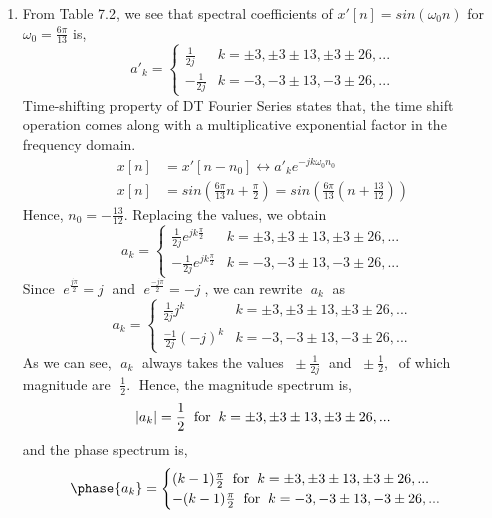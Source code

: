 \documentclass[10pt,a4paper, margin=1in]{article}
\begin{document}
\begin{enumerate}
\begin{enumerate}
    \item %
    From Table 7.2, we see that spectral coefficients of $x'[n]=sin(\omega_0n)$ for $\omega_0=\frac{6\pi}{13}$ is,
    $$a'_k = 
        \begin{cases}
             \frac{1}{2j} & k=\pm 3, \pm 3 \pm 13, \pm 3 \pm 26, ...\\
            -\frac{1}{2j} & k=-3, -3 \pm 13, -3 \pm 26, ...
        \end{cases}
    $$
    Time-shifting property of DT Fourier Series states that, the time shift operation comes along with a multiplicative exponential factor in the frequency domain.
    \begin{align*}
        x[n]&=x'[n-n_0] \leftrightarrow a'_ke^{-jk\omega_0n_0} \\
        x[n]&=sin(\frac{6\pi}{13}n+\frac{\pi}{2})=sin(\frac{6\pi}{13}(n+\frac{13}{12}))
    \end{align*}
    Hence, $n_0=-\frac{13}{12}$. Replacing the values, we obtain
    $$a_k = 
        \begin{cases}
            \frac{1}{2j}e^{jk\frac{\pi}{2}} & k=\pm 3, \pm 3 \pm 13, \pm 3 \pm 26, ...\\
            -\frac{1}{2j}e^{jk\frac{\pi}{2}} & k=-3, -3 \pm 13, -3 \pm 26, ...
        \end{cases}
    $$
    Since $\; e^{\frac{j\pi}{2}}=j \;$ and $\; e^{\frac{-j\pi}{2}} = -j \;$, we can rewrite $\; a_k \;$ as
    $$a_k =
        \begin{cases}
            \frac{1}{2j}j^k & k=\pm 3, \pm 3 \pm 13, \pm 3 \pm 26, ...\\
            \frac{-1}{2j}(-j)^k & k=-3, -3 \pm 13, -3 \pm 26, ...
        \end{cases}
    $$
    As we can see, $\;a_k\;$ always takes the values $\; \pm\frac{1}{2j}\;$ and $\; \pm\frac{1}{2}, \;$ of which magnitude are $\; \frac{1}{2}. \;$ Hence, the magnitude spectrum is,
    $$|a_k| = \frac{1}{2} \hspace{0.2cm} \text{for} \hspace{0.2cm} k=\pm 3, \pm 3 \pm 13, \pm 3 \pm 26, ...$$
    and the phase spectrum is,
    $$\phase{a_k} =
        \begin{cases}
            (k-1)\frac{\pi}{2} \hspace{0.2cm} \text{for} \hspace{0.2cm} k=\pm 3, \pm 3 \pm 13, \pm 3 \pm 26, ...\\
            -(k-1)\frac{\pi}{2} \hspace{0.2cm} \text{for} \hspace{0.2cm} k=-3, -3 \pm 13, -3 \pm 26, ...

\end{cases}$$
\end{enumerate}
\end{enumerate}
\end{document}
